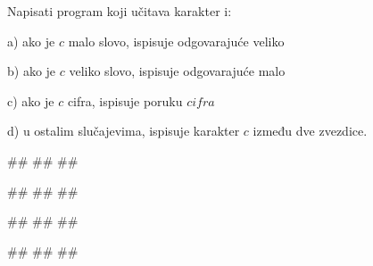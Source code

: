 \begin{Exercise}[label=p1.2_06] 
 Napisati program koji učitava karakter i:
 \begin{description}
\item{a)} ako je $c$ malo slovo, ispisuje odgovarajuće veliko
\item{b)} ako je $c$ veliko slovo, ispisuje odgovarajuće malo
\item{c)} ako je $c$ cifra, ispisuje poruku $cifra$
\item{d)} u ostalim slučajevima, ispisuje karakter $c$ između dve zvezdice.
\end{description}

\begin{miditest}
\begin{upotreba}{1}
#\naslovInt#
##
##
\end{upotreba}
\end{miditest}
\begin{miditest}
\begin{upotreba}{2}
#\naslovInt#
##
##
\end{upotreba}
\end{miditest}

\begin{miditest}
\begin{upotreba}{3}
#\naslovInt#
#\ulaz{>}#
#\izlaz{*>*}#
\end{upotreba}
\end{miditest}
\begin{miditest}
\begin{upotreba}{4}
#\naslovInt#
##
##
\end{upotreba}
\end{miditest}

\end{Exercise}
\begin{Answer}[ref=p1.2_06]
\end{Answer}


